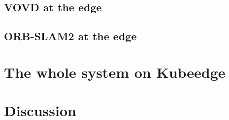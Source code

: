 \subsection{VOVD at the edge}


\subsection{ORB-SLAM2 at the edge}

\section{The whole system on Kubeedge}



\section{Discussion}



\clearpage
\thispagestyle{empty}